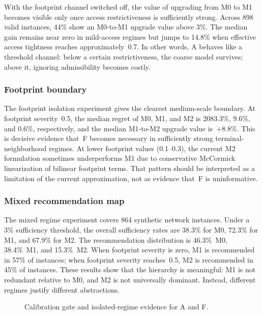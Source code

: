 \documentclass[review,authoryear]{elsarticle}
\begin{document}
With the footprint channel switched off, the value of upgrading from M0 to M1 becomes visible only once access restrictiveness is sufficiently strong. Across 898 valid instances, 44\% show an M0-to-M1 upgrade value above 3\%. The median gain remains near zero in mild-access regimes but jumps to 14.8\% when effective access tightness reaches approximately~0.7. In other words, A behaves like a threshold channel: below a certain restrictiveness, the coarse model survives; above it, ignoring admissibility becomes costly.

\subsubsection{Footprint boundary}
\label{sec:results:footprint}

The footprint isolation experiment gives the clearest medium-scale boundary. At footprint severity~0.5, the median regret of M0, M1, and M2 is 2083.3\%, 9.6\%, and 0.6\%, respectively, and the median M1-to-M2 upgrade value is~$+8.8\%$. This is decisive evidence that~F becomes necessary in sufficiently strong terminal-neighborhood regimes. At lower footprint values (0.1--0.3), the current M2 formulation sometimes underperforms M1 due to conservative McCormick linearization of bilinear footprint terms. That pattern should be interpreted as a limitation of the current approximation, not as evidence that~F is uninformative.

\subsubsection{Mixed recommendation map}
\label{sec:results:mixed}

The mixed regime experiment covers 864 synthetic network instances. Under a 3\% sufficiency threshold, the overall sufficiency rates are 38.3\% for M0, 72.3\% for M1, and 67.9\% for M2. The recommendation distribution is 46.3\%~M0, 38.4\%~M1, and 15.3\%~M2. When footprint severity is zero, M1 is recommended in 57\% of instances; when footprint severity reaches~0.5, M2 is recommended in 45\% of instances. These results show that the hierarchy is meaningful: M1 is not redundant relative to M0, and M2 is not universally dominant. Instead, different regimes justify different abstractions.

\begin{figure}[htbp]
  \centering
  \caption{Calibration gate and isolated-regime evidence for A and F.}
  \label{fig:regime}
\end{figure}
\end{document}
